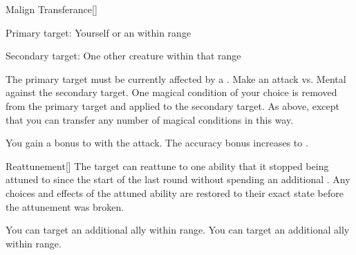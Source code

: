 \lowercase{\hypertarget{spell:Malign Transferance}{}}\label{spell:Malign Transferance}
\begin{freeability}[Rank 3]{\hypertarget{spell:Malign Transferance}{Malign Transferance}}[]

Primary target: Yourself or an  within \rngmed range
\par\noindent
Secondary target: One other creature within that range

The primary target must be currently affected by a  .
Make an attack vs. Mental against the secondary target.
\hit One magical condition of your choice is removed from the primary target and applied to the secondary target.
\crit As above, except that you can transfer any number of magical conditions in this way.

\rankline
{} You gain a  bonus to  with the attack.
 The accuracy bonus increases to .

\end{freeability}
\vspace{0.25em}



\lowercase{\hypertarget{spell:Reattunement}{}}\label{spell:Reattunement}
\begin{freeability}[Rank 3]{\hypertarget{spell:Reattunement}{Reattunement}}[]
The target can reattune to one ability that it stopped being attuned to since the start of the last round without spending an additional .
Any choices and effects of the attuned ability are restored to their exact state before the attunement was broken.

\rankline
{} You can target an additional ally within range.
 You can target an additional ally within range.

\end{freeability}
\vspace{0.25em}



